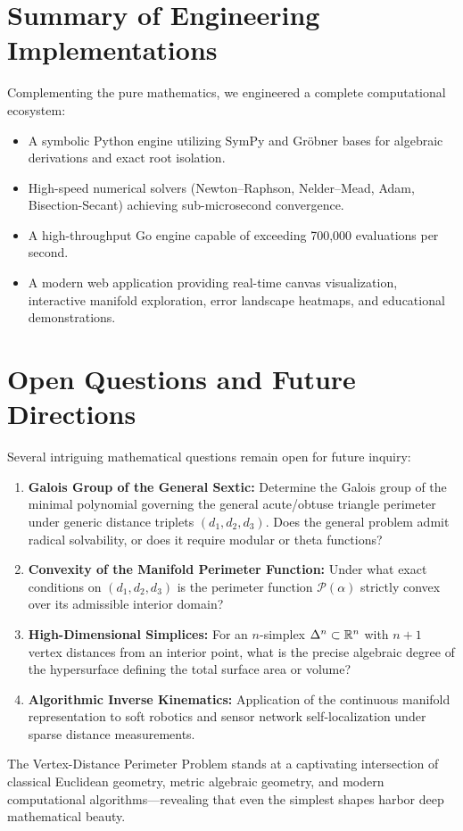 \section{Summary of Engineering Implementations}
Complementing the pure mathematics, we engineered a complete computational ecosystem:
\begin{itemize}
    \item A symbolic Python engine utilizing SymPy and Gröbner bases for algebraic derivations and exact root isolation.
    \item High-speed numerical solvers (Newton--Raphson, Nelder--Mead, Adam, Bisection-Secant) achieving sub-microsecond convergence.
    \item A high-throughput Go engine capable of exceeding 700,000 evaluations per second.
    \item A modern web application providing real-time canvas visualization, interactive manifold exploration, error landscape heatmaps, and educational demonstrations.
\end{itemize}

\section{Open Questions and Future Directions}
Several intriguing mathematical questions remain open for future inquiry:
\begin{enumerate}
    \item \textbf{Galois Group of the General Sextic:} Determine the Galois group of the minimal polynomial governing the general acute/obtuse triangle perimeter under generic distance triplets $(d_1, d_2, d_3)$. Does the general problem admit radical solvability, or does it require modular or theta functions?
    \item \textbf{Convexity of the Manifold Perimeter Function:} Under what exact conditions on $(d_1, d_2, d_3)$ is the perimeter function $\mathcal{P}(\alpha)$ strictly convex over its admissible interior domain?
    \item \textbf{High-Dimensional Simplices:} For an $n$-simplex $\Delta^n \subset \mathbb{R}^n$ with $n+1$ vertex distances from an interior point, what is the precise algebraic degree of the hypersurface defining the total surface area or volume?
    \item \textbf{Algorithmic Inverse Kinematics:} Application of the continuous manifold representation to soft robotics and sensor network self-localization under sparse distance measurements.
\end{enumerate}

The Vertex-Distance Perimeter Problem stands at a captivating intersection of classical Euclidean geometry, metric algebraic geometry, and modern computational algorithms---revealing that even the simplest shapes harbor deep mathematical beauty.
